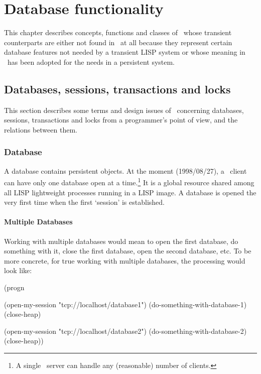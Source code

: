 %

\chapter{Database functionality}

This chapter describes concepts, functions and classes of \plob\ whose
transient counterparts are either not found in \cite{bib:CLtLII}\ at
all because they represent certain database features not needed by a
transient LISP system or whose meaning in \plob\ has been adopted for
the needs in a persistent system.

\section{Databases, sessions, transactions and locks}

This section describes some terms and design issues of \plob\ 
concerning databases, sessions, transactions and locks from a
programmer's point of view, and the relations between them.

\subsection{Database}

A database contains persistent objects. At the moment (1998/08/27), a
\plob\ client can have only one database open at a
time.\footnote{A single \plob\ server can handle any (reasonable)
  number of clients.} It is a global resource shared among all LISP
lightweight processes running in a LISP image. A database is opened
the very first time when the first `session' is established.

\subsubsection{Multiple Databases}

Working with multiple databases would mean to open the first database,
do something with it, close the first database, open the second
database, etc. To be more concrete, for true working with multiple
databases, the processing would look like:
\begin{IndentedCompactCode}
(progn

  (open-my-session "tcp://localhost/database1")
  (do-something-with-database-1)
  (close-heap)

  (open-my-session "tcp://localhost/database2")
  (do-something-with-database-2)
  (close-heap))
\end{IndentedCompactCode}


